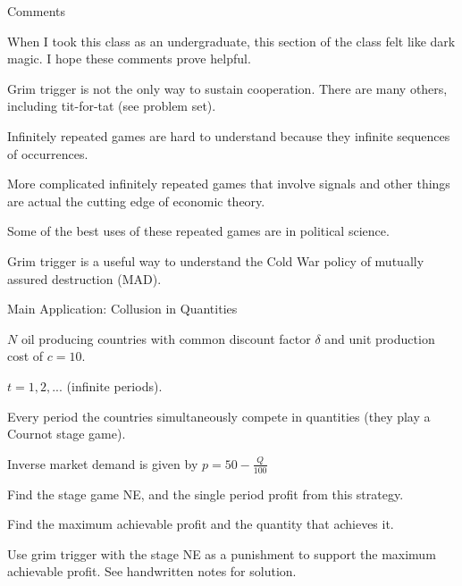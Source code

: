 \documentclass[aspectratio=169]{beamer}
\newenvironment{wideitemize}{\itemize\addtolength{\itemsep}{10pt}}{\enditemize}
\begin{document}
\begin{frame}{Comments}

When I took this class as an undergraduate, this section of the class felt like dark magic. I hope these comments prove helpful.

\begin{wideitemize}
    \item Grim trigger is not the only way to sustain cooperation. There are many others, including tit-for-tat (see problem set).
    \item Infinitely repeated games are hard to understand because they infinite sequences of occurrences.
    \item More complicated infinitely repeated games that involve signals and other things are actual the cutting edge of economic theory.
    \item Some of the best uses of these repeated games are in political science.
    \item Grim trigger is a useful way to understand the Cold War policy of mutually assured destruction (MAD).
\end{wideitemize}
    
\end{frame}
\begin{frame}{Main Application: Collusion in Quantities}
\begin{wideitemize}
    \item $N$ oil producing countries with common discount factor $\delta$ and unit production cost of $c=10$.
    \item $t=1,2,...$ (infinite periods).
    \item Every period the countries simultaneously compete in quantities (they play a Cournot stage game).
    \item Inverse market demand is given by $p = 50-\frac{Q}{100} $
    \item Find the stage game NE, and the single period profit from this strategy.
    \item Find the maximum achievable profit and the quantity that achieves it.
    \item Use grim trigger with the stage NE as a punishment to support the maximum achievable profit.
\end{wideitemize}
See handwritten notes for solution.
\end{frame}
\end{document}
